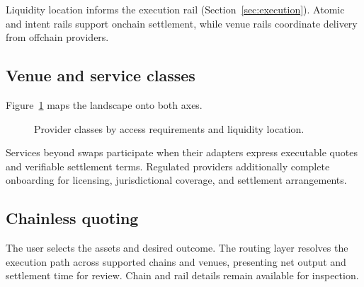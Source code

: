 Liquidity location informs the execution rail (Section~\ref{sec:execution}). Atomic and intent rails support onchain settlement, while venue rails coordinate delivery from offchain providers.

\subsection{Venue and service classes}\label{sec:venue-classes}

Figure~\ref{fig:axes} maps the landscape onto both axes.

\begin{figure}[H]
\centering
{}
\caption{Provider classes by access requirements and liquidity location.}
\label{fig:axes}
\end{figure}

Services beyond swaps participate when their adapters express executable quotes and verifiable settlement terms. Regulated providers additionally complete onboarding for licensing, jurisdictional coverage, and settlement arrangements.

\subsection{Chainless quoting}

The user selects the assets and desired outcome. The routing layer resolves the execution path across supported chains and venues, presenting net output and settlement time for review. Chain and rail details remain available for inspection.
